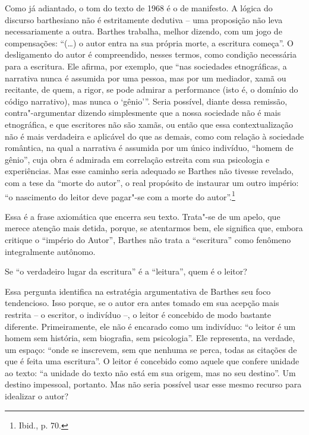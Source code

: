 Como já adiantado, o tom do texto de 1968 é o de manifesto. A lógica do
discurso barthesiano não é estritamente dedutiva -- uma proposição não
leva necessariamente a outra. Barthes trabalha, melhor dizendo, com um
jogo de compensações: ``(\ldots{}) o autor entra na sua própria morte, a
escritura começa''. O desligamento do autor é compreendido, nesses
termos, como condição necessária para a escritura. Ele afirma, por
exemplo, que ``nas sociedades etnográficas, a narrativa nunca é assumida
por uma pessoa, mas por um mediador, xamã ou recitante, de quem, a
rigor, se pode admirar a performance (isto é, o domínio do código
narrativo), mas nunca o `gênio'''. Seria possível, diante dessa
remissão, contra"-argumentar dizendo simplesmente que a nossa sociedade não
é mais etnográfica, e que escritores não são xamãs, ou então que essa
contextualização não é mais verdadeira e aplicável do que as demais,
como com relação à sociedade romântica, na qual a narrativa é
assumida por um único indivíduo, ``homem de gênio'', cuja obra é
admirada em correlação estreita com sua psicologia e experiências. Mas
esse caminho seria adequado se Barthes não tivesse revelado, com a tese
da ``morte do autor'', o real propósito de instaurar um outro império:
``o nascimento do leitor deve pagar"-se com a morte do autor''.\footnote{Ibid.,
  p. 70.}

Essa é a frase axiomática que encerra seu texto. Trata"-se de um apelo,
que merece atenção mais detida, porque, se atentarmos bem, ele significa
que, embora critique o ``império do Autor'', Barthes não trata a
``escritura'' como fenômeno integralmente autônomo.

Se ``o verdadeiro lugar da escritura'' é a ``leitura'', quem é o leitor?

Essa pergunta identifica na estratégia argumentativa de Barthes seu foco
tendencioso. Isso porque, se o autor era antes tomado em sua acepção
mais restrita -- o escritor, o indivíduo --, o leitor é concebido de
modo bastante diferente. Primeiramente, ele não é encarado como um
indivíduo: ``o leitor é um homem sem história, sem biografia, sem
psicologia''. Ele representa, na verdade, um espaço: ``onde se
inscrevem, sem que nenhuma se perca, todas as citações de que é feita
uma escritura''. O leitor é concebido como aquele que confere unidade ao
texto: ``a unidade do texto não está em sua origem, mas no seu
destino''. Um destino impessoal, portanto. Mas não seria possível usar
esse mesmo recurso para idealizar o autor?


